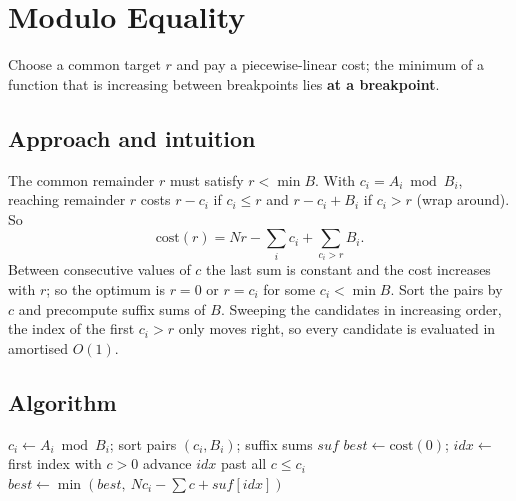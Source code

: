 \section{Modulo Equality}
\label{sec:n-modulo-equality}


\begin{patternbox}
Choose a common target $r$ and pay a piecewise-linear cost; the minimum of a
function that is increasing between breakpoints lies \textbf{at a breakpoint}.
\end{patternbox}

\subsection*{Approach and intuition}

The common remainder $r$ must satisfy $r<\min B$. With $c_i=A_i\bmod B_i$,
reaching remainder $r$ costs $r-c_i$ if $c_i\le r$ and $r-c_i+B_i$ if $c_i>r$
(wrap around). So
\[
  \text{cost}(r)=N r-\sum_i c_i+\sum_{c_i>r}B_i .
\]
Between consecutive values of $c$ the last sum is constant and the cost
increases with $r$; so the optimum is $r=0$ or $r=c_i$ for some $c_i<\min B$.
Sort the pairs by $c$ and precompute suffix sums of $B$. Sweeping the
candidates in increasing order, the index of the first $c_i>r$ only moves
right, so every candidate is evaluated in amortised $O(1)$.

\subsection*{Algorithm}
\begin{algorithmic}[1]
\State $c_i\gets A_i\bmod B_i$; sort pairs $(c_i,B_i)$; suffix sums $suf$
\State $best\gets\text{cost}(0)$; $idx\gets$ first index with $c>0$
  \State advance $idx$ past all $c\le c_i$
  \State $best\gets\min(best,\ N c_i-\sum c+suf[idx])$
\EndFor
\end{algorithmic}



